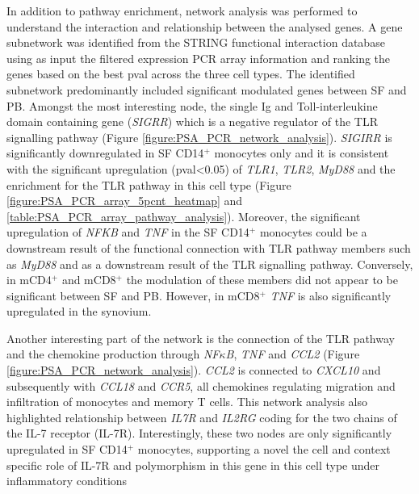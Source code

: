 In addition to pathway enrichment, network analysis was performed to understand the interaction and relationship between the analysed genes. A gene subnetwork was identified from the STRING functional interaction database using as input the filtered expression PCR array information and ranking the genes based on the best pval across the three cell types. The identified subnetwork predominantly included  significant modulated genes between SF and PB. Amongst the most interesting node, the single Ig and Toll-interleukine domain containing gene (\textit{SIGRR}) which is a negative regulator of the TLR signalling pathway (Figure \ref{figure:PSA_PCR_network_analysis}). \textit{SIGIRR} is significantly downregulated in SF CD14$^+$ monocytes only and it is consistent with the significant upregulation (pval<0.05) of \textit{TLR1}, \textit{TLR2}, \textit{MyD88} and the enrichment for the TLR pathway in this cell type (Figure \ref{figure:PSA_PCR_array_5pcnt_heatmap} and \ref{table:PSA_PCR_array_pathway_analysis}). Moreover, the significant upregulation of \textit{NFKB} and \textit{TNF} in the SF CD14$^+$ monocytes could be a downstream result of the functional connection with TLR pathway members such as \textit{MyD88} and as a downstream result of the TLR signalling pathway. Conversely, in mCD4$^+$ and mCD8$^+$ the modulation of these members did not appear to be significant between SF and PB. However, in mCD8$^+$ \textit{TNF} is also significantly upregulated in the synovium. 

Another interesting part of the network is the connection of the TLR pathway and the chemokine production through \textit{NF$\kappa$B}, \textit{TNF} and \textit{CCL2} (Figure \ref{figure:PSA_PCR_network_analysis}). \textit{CCL2} is connected to \textit{CXCL10} and subsequently with \textit{CCL18} and \textit{CCR5}, all chemokines regulating migration and infiltration of monocytes and memory T cells. This network analysis also highlighted relationship between \textit{IL7R} and \textit{IL2RG} coding for the two chains of the IL-7 receptor (IL-7R). Interestingly, these two nodes are only significantly upregulated in SF CD14$^+$ monocytes, supporting a novel the cell and context specific role of IL-7R and polymorphism in this gene in this cell type under inflammatory conditions %


